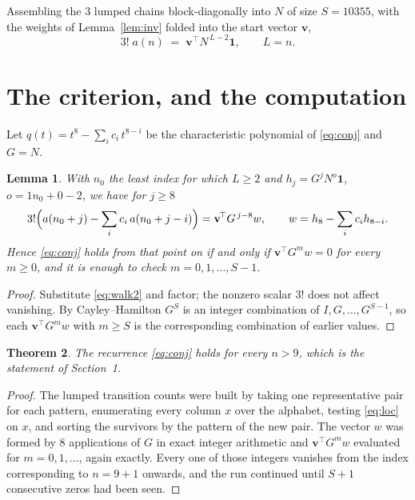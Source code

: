 \documentclass[11pt,a4paper]{article}
\theoremstyle{plain}
\newtheorem{theorem}{Theorem}
\newtheorem{lemma}[theorem]{Lemma}
\theoremstyle{definition}
\begin{document}
Assembling the $3$ lumped chains block-diagonally into $N$ of size $S=10355$, with the
weights of Lemma~\ref{lem:inv} folded into the start vector $\mathbf{v}$,
\begin{equation}\label{eq:walk2}
3!\;a(n)\;=\;\mathbf{v}^{\!\top}N^{\,L-2}\mathbf{1},\qquad L=n .
\end{equation}

\section{The criterion, and the computation}

Let $q(t)=t^{8}-\sum_i c_i\,t^{8-i}$ be the characteristic polynomial of
\eqref{eq:conj} and $G=N$.

\begin{lemma}\label{lem:crit}
With $n_0$ the least index for which $L\ge2$ and $h_j=G^{j}N^{o}\mathbf{1}$,
$o=1n_0+0-2$, we have for $j\ge8$
\[
3!\Bigl(a(n_0+j)-\sum_i c_i\,a(n_0+j-i)\Bigr)
=\mathbf{v}^{\!\top}G^{\,j-8}w,\qquad
w=h_{8}-\sum_i c_i h_{8-i} .
\]
Hence \eqref{eq:conj} holds from that point on if and only if
$\mathbf{v}^{\!\top}G^{m}w=0$ for every $m\ge0$, and it is enough to check
$m=0,1,\dots,S-1$.
\end{lemma}

\begin{proof}
Substitute \eqref{eq:walk2} and factor; the nonzero scalar $3!$ does not affect
vanishing. By Cayley--Hamilton $G^{S}$ is an integer combination of $I,G,\dots,G^{S-1}$,
so each $\mathbf{v}^{\!\top}G^{m}w$ with $m\ge S$ is the corresponding combination of
earlier values.
\end{proof}

\begin{theorem}
The recurrence \eqref{eq:conj} holds for every $n>9$, which is the statement of
Section~1.
\end{theorem}

\begin{proof}
The lumped transition counts were built by taking one representative pair for each pattern,
enumerating every column $x$ over the alphabet, testing \eqref{eq:loc} on $x$, and sorting
the survivors by the pattern of the new pair. The vector $w$ was formed by $8$
applications of $G$ in exact integer arithmetic and $\mathbf{v}^{\!\top}G^{m}w$
evaluated for $m=0,1,\dots$, again exactly. Every one of those integers vanishes from the
index corresponding to $n=9+1$ onwards, and the run continued until $S+1$ consecutive
zeros had been seen.
\end{proof}
\end{document}
